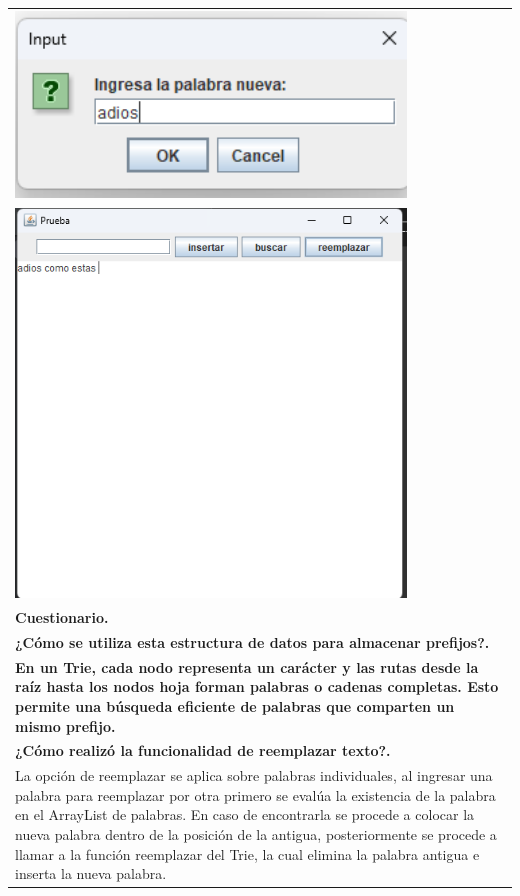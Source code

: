 \documentclass[9pt]{article}
\begin{document}
\begin{longtable}{|p{15cm}|}
		\includegraphics[width=0.8\textwidth,keepaspectratio]{img/reemplazando2.png}\\
		\includegraphics[width=0.8\textwidth,keepaspectratio]{img/reemplazo.png}\\
		\textbf{Cuestionario.}  \\
		\textbf{¿Cómo se utiliza esta estructura de datos para almacenar prefijos?.}  \\
		\textbf{ En un Trie, cada nodo representa un carácter y las rutas desde la raíz hasta los nodos hoja forman palabras o cadenas completas. Esto permite una búsqueda eficiente de palabras que comparten un mismo prefijo.}\\
		\textbf{¿Cómo realizó la funcionalidad de reemplazar texto?.}  \\
		La opción de reemplazar se aplica sobre palabras individuales, al ingresar una palabra para reemplazar por otra primero se evalúa la existencia de la palabra en el ArrayList de palabras. En caso de encontrarla se procede a colocar la nueva palabra dentro de la posición de la antigua, posteriormente se procede a llamar a la función reemplazar del Trie, la cual elimina la palabra antigua e inserta la nueva palabra.\\
		\hline
	\end{longtable}
\end{document}
